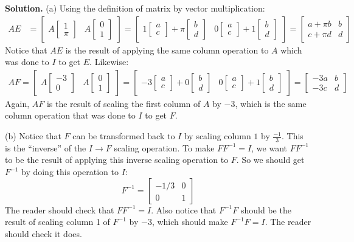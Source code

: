 \documentclass[11pt, letterpaper]{report}
\newenvironment{notes}{}{}
\newenvironment{book}{}{}
\newcommand{\bbvec}[2]{
  \begin{bmatrix} #1 \\ #2 \end{bmatrix}
}
\begin{document}
\begin{notes}
\vfill
\end{notes}

\begin{book}
\textbf{Solution.} (a) Using the definition of matrix by vector multiplication:
\begin{align*}
AE &= \begin{bmatrix}
A \bbvec{1}{\pi} & A \bbvec{0}{1}
\end{bmatrix}= \begin{bmatrix}
1 \bbvec{a}{c} + \pi \bbvec{b}{d} & 0 \bbvec{a}{c} + 1 \bbvec{b}{d}
\end{bmatrix} = \begin{bmatrix}
a + \pi b & b \\
c + \pi d & d
\end{bmatrix}
\end{align*}
Notice that $AE$ is the result of applying the same column operation to $A$ which was done to $I$ to get $E$. Likewise:
\begin{align*}
AF =  \begin{bmatrix}
A \bbvec{-3}{0} & A \bbvec{0}{1}
\end{bmatrix}= \begin{bmatrix}
-3 \bbvec{a}{c} + 0\bbvec{b}{d} & 0 \bbvec{a}{c} + 1 \bbvec{b}{d}
\end{bmatrix} = \begin{bmatrix}
-3a  & b \\
-3c  & d
\end{bmatrix}
\end{align*}
Again, $AF$ is the result of scaling the first column of $A$ by $-3$, which is the same column operation that was done to $I$ to get $F$.

(b) Notice that $F$ can be transformed back to $I$ by scaling column $1$ by $\frac{-1}{3}$. This is the ``inverse'' of the $I \rightarrow F$ scaling operation. To make $FF^{-1} = I$, we want $FF^{-1}$ to be the result of applying this inverse scaling operation to $F$. So we should get $F^{-1}$ by doing this operation to $I$:
\[F^{-1} = \begin{bmatrix}
-1/3 & 0 \\
0 & 1
\end{bmatrix}\]
The reader should check that $FF^{-1} = I$. Also notice that $F^{-1}F$ should be the result of scaling column 1 of $F^{-1}$ by $-3$, which should make $F^{-1}F = I$. The reader should check it does. \blacksquare
\end{book}
\end{document}
